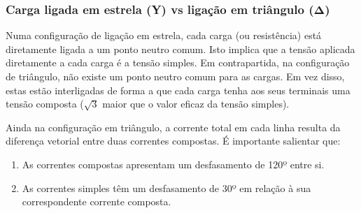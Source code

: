 \subsubsection*{Carga ligada em estrela (Y) vs ligação em triângulo ($\pmb{\Delta}$)}

 Numa configuração de ligação em estrela, cada carga (ou resistência) está diretamente ligada a um ponto neutro comum. Isto implica que a tensão aplicada diretamente a cada carga é a tensão simples. Em contrapartida, na configuração de triângulo, não existe um ponto neutro comum para as cargas. Em vez disso, estas estão interligadas de forma a que cada carga tenha aos seus terminais uma tensão composta ($\sqrt{3}$ maior que o valor eficaz da tensão simples).

\noindent Ainda na configuração em triângulo, a corrente total em cada linha resulta da diferença vetorial entre duas correntes compostas. É importante salientar que:
\begin{enumerate}  
    \item As correntes compostas apresentam um desfasamento de 120º entre si.
    \item As correntes simples têm um desfasamento de 30º em relação à sua correspondente corrente composta.
\end{enumerate}

